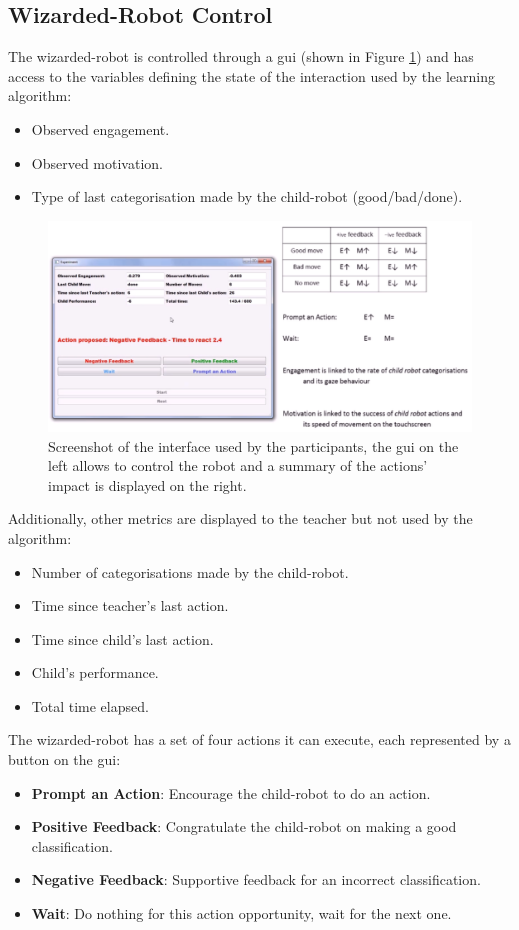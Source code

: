 \subsection{Wizarded-Robot Control}
\label{ssec:woz_wizarded_robot}
The wizarded-robot is controlled through a \gls{gui} (shown in Figure \ref{fig:woz_gui}) and has access to the variables defining the state of the interaction used by the learning algorithm:
\begin{itemize}
	\item Observed engagement.
	\item Observed motivation.
	\item Type of last categorisation made by the child-robot (good/bad/done).
\end{itemize}

\begin{figure}[ht]
	\centering
	\includegraphics[width=.9\textwidth]{GUI-woz.png}
	\caption{Screenshot of the interface used by the participants, the \gls{gui} on the left allows to control the robot and a summary of the actions' impact is displayed on the right.}
	\label{fig:woz_gui}
\end{figure}

Additionally, other metrics are displayed to the teacher but not used by the algorithm:
\begin{itemize}
	\item Number of categorisations made by the child-robot.
	\item Time since teacher's last action.
	\item Time since child's last action.
	\item Child's performance.
	\item Total time elapsed.
\end{itemize}


The wizarded-robot has a set of four actions it can execute, each represented by a button on the \gls{gui}: 
\begin{itemize}
	\item \textbf{Prompt an Action}: Encourage the child-robot to do an action.
	\item \textbf{Positive Feedback}: Congratulate the child-robot on making a good classification.
	\item \textbf{Negative Feedback}: Supportive feedback for an incorrect classification.
	\item \textbf{Wait}: Do nothing for this action opportunity, wait for the next one.
\end{itemize}


